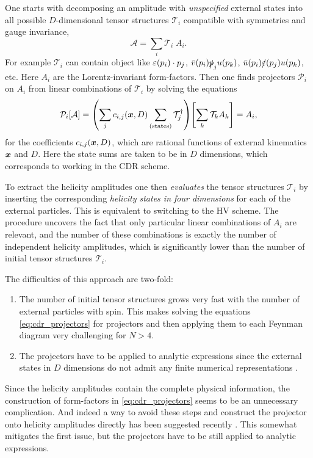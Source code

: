 One starts with decomposing an amplitude with \emph{unspecified} external states into all possible $D$-dimensional tensor structures $\mathcal{T}_i$ compatible
with symmetries and gauge invariance,
\begin{equation}
  \mathcal{A}  = \sum_{i} \mathcal{T}_i\;A_i.
\end{equation}
For example $\mathcal{T}_i$ can contain object like $\sp(\varepsilon(p_i),p_j)$, $\bar{v}(p_i) \slashed{p}_j u(p_k) $, $\bar{u}(p_i) \slashed{\varepsilon}(p_j) u(p_k)$, etc.
Here $A_i$ are the Lorentz-invariant form-factors.
Then one finds projectors $\mathcal{P}_i$ on $A_i$ from linear combinations of $\mathcal{T}_i$ by solving the equations
\begin{equation} \label{eq:cdr_projectors}
  \mathcal{P}_i [\mathcal{A}] = \qty(\sum_j c_{i,j}(\vb*{x},D) \sum_\text{(states)} \mathcal{T}^{\dagger}_j) \qty[\sum_{k} \mathcal{T}_k A_k] = A_i, 
\end{equation}
for the coefficients $c_{i,j}(\vb*{x},D)$, which are rational functions of external kinematics $\vb*{x}$ and $D$.
Here the state sums are taken to be in $D$ dimensions, which corresponds to working in the CDR scheme.

To extract the helicity amplitudes one then \textit{evaluates} the tensor structures $\mathcal{T}_i$ 
by inserting the corresponding \textit{helicity states in four dimensions} for each of the external particles. 
This is equivalent to switching to the HV scheme.
The procedure uncovers the fact that only particular linear combinations of $A_i$ are relevant,
and the number of these combinations is exactly the number of independent helicity amplitudes, which is
significantly lower than the number of initial tensor structures $\mathcal{T}_i$.

The difficulties of this approach are two-fold:
\begin{enumerate}
  \item The number of initial tensor structures grows very fast with the number of external particles with spin.
    This makes solving the equations \cref{eq:cdr_projectors} for projectors and then applying them to each Feynman diagram very challenging for $N>4$.
  \item The projectors have to be applied to analytic expressions since the external states in $D$ dimensions do not admit any finite numerical representations \cite{Collins:1984xc}.
\end{enumerate}

Since the helicity amplitudes contain the complete physical information, 
the construction of form-factors in  \cref{eq:cdr_projectors} seems to be an unnecessary complication.
And indeed a way to avoid these steps and construct the projector onto helicity amplitudes directly has been suggested recently \cite{Peraro:2019cjj}.
This somewhat mitigates the first issue, but the projectors have to be still applied to analytic expressions.

